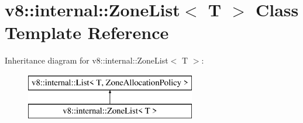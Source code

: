 \hypertarget{classv8_1_1internal_1_1_zone_list}{}\section{v8\+:\+:internal\+:\+:Zone\+List$<$ T $>$ Class Template Reference}
\label{classv8_1_1internal_1_1_zone_list}
Inheritance diagram for v8\+:\+:internal\+:\+:Zone\+List$<$ T $>$\+:\begin{figure}[H]
\begin{center}
\leavevmode
\includegraphics[height=2.000000cm]{classv8_1_1internal_1_1_zone_list}
\end{center}
\end{figure}
